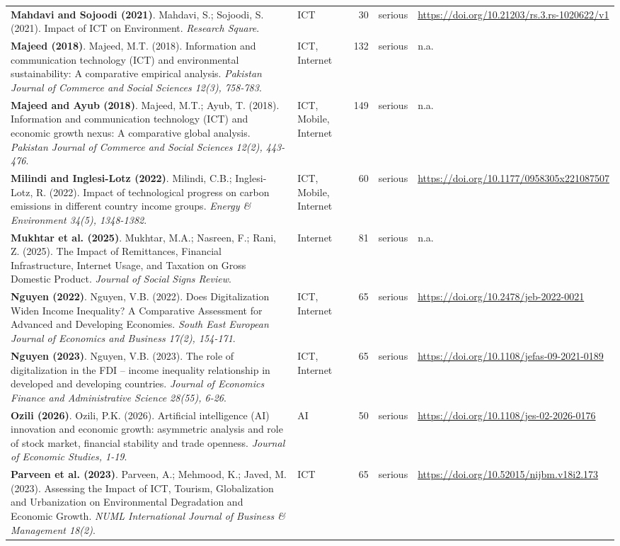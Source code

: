 {\begin{longtable}{@{}p{7.4cm} p{1.3cm} r l p{3.4cm}@{}}
\textbf{Mahdavi and Sojoodi (2021)}. Mahdavi, S.; Sojoodi, S. (2021). Impact of ICT on Environment. \emph{Research Square}. & ICT & 30 & serious & \url{https://doi.org/10.21203/rs.3.rs-1020622/v1} \\
\textbf{Majeed (2018)}. Majeed, M.T. (2018). Information and communication technology (ICT) and environmental sustainability: A comparative empirical analysis. \emph{Pakistan Journal of Commerce and Social Sciences 12(3), 758-783}. & ICT, Internet & 132 & serious & n.a. \\
\textbf{Majeed and Ayub (2018)}. Majeed, M.T.; Ayub, T. (2018). Information and communication technology (ICT) and economic growth nexus: A comparative global analysis. \emph{Pakistan Journal of Commerce and Social Sciences 12(2), 443-476}. & ICT, Mobile, Internet & 149 & serious & n.a. \\
\textbf{Milindi and Inglesi-Lotz (2022)}. Milindi, C.B.; Inglesi-Lotz, R. (2022). Impact of technological progress on carbon emissions in different country income groups. \emph{Energy \& Environment 34(5), 1348-1382}. & ICT, Mobile, Internet & 60 & serious & \url{https://doi.org/10.1177/0958305x221087507} \\
\textbf{Mukhtar et al. (2025)}. Mukhtar, M.A.; Nasreen, F.; Rani, Z. (2025). The Impact of Remittances, Financial Infrastructure, Internet Usage, and Taxation on Gross Domestic Product. \emph{Journal of Social Signs Review}. & Internet & 81 & serious & n.a. \\
\textbf{Nguyen (2022)}. Nguyen, V.B. (2022). Does Digitalization Widen Income Inequality? A Comparative Assessment for Advanced and Developing Economies. \emph{South East European Journal of Economics and Business 17(2), 154-171}. & ICT, Internet & 65 & serious & \url{https://doi.org/10.2478/jeb-2022-0021} \\
\textbf{Nguyen (2023)}. Nguyen, V.B. (2023). The role of digitalization in the FDI – income inequality relationship in developed and developing countries. \emph{Journal of Economics Finance and Administrative Science 28(55), 6-26}. & ICT, Internet & 65 & serious & \url{https://doi.org/10.1108/jefas-09-2021-0189} \\
\textbf{Ozili (2026)}. Ozili, P.K. (2026). Artificial intelligence (AI) innovation and economic growth: asymmetric analysis and role of stock market, financial stability and trade openness. \emph{Journal of Economic Studies, 1-19}. & AI & 50 & serious & \url{https://doi.org/10.1108/jes-02-2026-0176} \\
\textbf{Parveen et al. (2023)}. Parveen, A.; Mehmood, K.; Javed, M. (2023). Assessing the Impact of ICT, Tourism, Globalization and Urbanization on Environmental Degradation and Economic Growth. \emph{NUML International Journal of Business \& Management 18(2)}. & ICT & 65 & serious & \url{https://doi.org/10.52015/nijbm.v18i2.173} \\

\end{longtable}}
